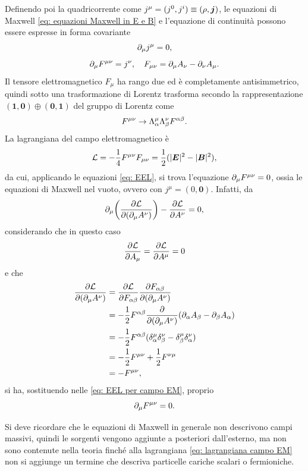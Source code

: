 Definendo poi la quadricorrente come $j^\mu = (j^0,j^i) \equiv (\rho,\bm{j})$, le equazioni di Maxwell \eqref{eq: equazioni Maxwell in E e B} e l'equazione di continuità possono essere espresse in forma covariante
\begin{equation}
\label{eq: equazione continuità covariante}
    \partial_\mu j^\mu = 0,
\end{equation}
\begin{equation}
\label{eq: equazioni Maxwell covarianti}
    \partial_\mu F^{\mu\nu} = j^\nu,\quad F_{\mu\nu} = \partial_\mu A_\nu - \partial_\nu A_\mu.
\end{equation}
Il tensore elettromagnetico $F_{\mu}$ ha rango due ed è completamente antisimmetrico, quindi sotto una trasformazione di Lorentz trasforma secondo la rappresentazione $\bm{(1,0)}\oplus\bm{(0,1)}$ del gruppo di Lorentz come
\begin{equation}
    F^{\mu\nu}\to\Lambda^\mu_\alpha\Lambda^\nu_\beta F^{\alpha\beta}.
\end{equation}
La lagrangiana del campo elettromagnetico è
\begin{equation}
\label{eq: lagrangiana campo EM}
    \mathcal{L} = -\frac{1}{4}F^{\mu\nu}F_{\mu\nu} = \frac{1}{2}(|\bm{E}|^2 - |\bm{B}|^2),
\end{equation}
da cui, applicando le equazioni \eqref{eq: EEL}, si trova l'equazione $\partial_\mu F^{\mu\nu} = 0$, ossia le equazioni di Maxwell nel vuoto, ovvero con $j^\mu = (0,\bm{0})$. Infatti, da
\begin{equation}
\label{eq: EEL per campo EM}
    \partial_\mu\bigg(\frac{\partial\mathcal{L}}{\partial(\partial_\mu A^\nu)}\bigg) - \frac{\partial\mathcal{L}}{\partial A^\nu} = 0,
\end{equation}
considerando che in questo caso
\begin{equation}
    \frac{\partial\mathcal{L}}{\partial A_\mu} = \frac{\partial\mathcal{L}}{\partial A^\mu} = 0
\end{equation}
e che
\begin{equation}
    \begin{split}
        \frac{\partial\mathcal{L}}{\partial(\partial_\mu A^\nu)} &= \frac{\partial\mathcal{L}}{\partial F_{\alpha\beta}}\frac{\partial F_{\alpha\beta}}{\partial(\partial_\mu A^\nu)} \\
        &=-\frac{1}{2}F^{\alpha\beta}\frac{\partial}{\partial(\partial_\mu A^\nu)}(\partial_\alpha A_\beta - \partial_\beta A_\alpha) \\
        &= -\frac{1}{2}F^{\alpha\beta}(\delta^\mu_\alpha\delta^\nu_\beta - \delta^\mu_\beta\delta^\nu_\alpha) \\
        &= -\frac{1}{2}F^{\mu\nu} + \frac{1}{2}F^{\nu\mu} \\
        &= -F^{\mu\nu},
    \end{split}
\end{equation}
si ha, sostituendo nelle \eqref{eq: EEL per campo EM}, proprio
\begin{equation}
    \partial_\mu F^{\mu\nu} = 0.
\end{equation}
\begin{obs}
    Si deve ricordare che le equazioni di Maxwell in generale non descrivono campi massivi, quindi le sorgenti vengono aggiunte a posteriori dall'esterno, ma non sono contenute nella teoria finché alla lagrangiana \eqref{eq: lagrangiana campo EM} non si aggiunge un termine che descriva particelle cariche scalari o fermioniche. 
\end{obs}


